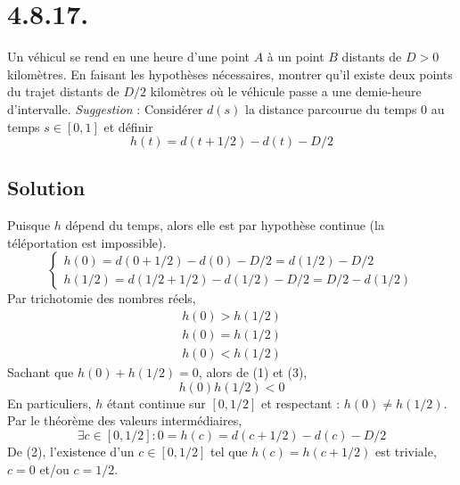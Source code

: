 \section*{4.8.17.}
	Un véhicul se rend en une heure d'une point $A$ à un point $B$ distants de $D>0$ kilomètres. En faisant les hypothèses nécessaires, montrer qu'il existe deux points du trajet distants de $D/2$ kilomètres où le véhicule passe a une demie-heure d'intervalle. \textit{Suggestion} : Considérer $d(s)$ la distance parcourue du temps $0$ au temps $s\in [0,1]$ et définir
	\[h(t)= d(t+1/2)-d(t)-D/2\] 
	\subsection*{Solution}
	Puisque $h$ dépend du temps, alors elle est par hypothèse continue (la téléportation est impossible).
	\[
	\begin{cases}
		h(0)=d(0+1/2)-d(0)-D/2=d(1/2)-D/2\\
		h(1/2)=d(1/2+1/2)-d(1/2)-D/2=D/2-d(1/2)
	\end{cases}\]
	Par trichotomie des nombres réels,
	\begin{align}
	h(0)>h(1/2)\\
	h(0)=h(1/2)\\
	h(0)<h(1/2)
	\end{align}
	Sachant que $h(0)+h(1/2)=0$, alors de (1) et (3),
	\[h(0)h(1/2)<0\]
	En particuliers, $h$ étant continue sur $[0,1/2]$ et respectant : $h(0)\neq h(1/2)$. Par le théorème des valeurs intermédiaires,
	\[\exists c\in[0,1/2] : 0=h(c)=d(c+1/2)-d(c)-D/2 \]
	De (2), l'existence d'un $c\in [0,1/2]$ tel que $h(c)=h(c+1/2)$ est triviale, $c=0$ et/ou $c=1/2$.